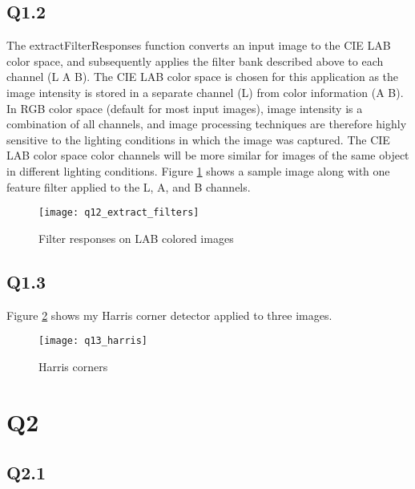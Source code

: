 \documentclass[12pt]{article}
\begin{document}
\subsection{Q1.2}
The extractFilterResponses function converts an input image to the CIE LAB color space, and subsequently applies the filter bank described above to each channel (L A B).
The CIE LAB color space is chosen for this application as the image intensity is stored in a separate channel (L) from color information (A B). In RGB color space (default for most input images), image intensity is a combination of all channels, and image processing techniques are therefore highly sensitive to the lighting conditions in which the image was captured. The CIE LAB color space color channels will be more similar for images of the same object in different lighting conditions. Figure \ref{fig:extract_filter_responses} shows a sample image along with one feature filter applied to the L, A, and B channels.

\begin{figure}[H]
\centering
\texttt{[image: q12\_extract\_filters]}
\caption{Filter responses on LAB colored images}    
\label{fig:extract_filter_responses}
\end{figure}   

\newpage
\subsection{Q1.3}

Figure \ref{fig:harris_corners} shows my Harris corner detector applied to three images.

\begin{figure}[H]
\centering
\texttt{[image: q13\_harris]}
\caption{Harris corners}    
\label{fig:harris_corners}
\end{figure}   

\newpage
\section{Q2}
\subsection{Q2.1}
\end{document}
